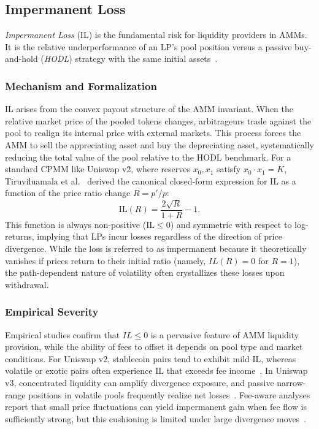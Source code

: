 \documentclass[10pt,conference,compsocconf]{IEEEtran}
\begin{document}
\subsection{Impermanent Loss}
\label{sec:background_il}

\emph{Impermanent Loss} (IL) is the fundamental risk for liquidity providers in AMMs. It is the relative underperformance of an LP's pool position versus a passive buy-and-hold (\emph{HODL}) strategy with the same initial assets~\cite{evans2021liquidity, aoyagi2020liquidity}.


\subsubsection{Mechanism and Formalization}
IL arises from the convex payout structure of the AMM invariant. When the relative market price of the pooled tokens changes, arbitrageurs trade against the pool to realign its internal price with external markets. This process forces the AMM to sell the appreciating asset and buy the depreciating asset, systematically reducing the total value of the pool relative to the HODL benchmark.
For a standard CPMM like Uniswap v2, where reserves $x_0, x_1$ satisfy $x_0 \cdot x_1 = K$, Tiruviluamala et al.~\cite{tiruviluamala2022general} derived the canonical closed-form expression for IL as a function of the price ratio change $R = p'/p$:
\begin{equation}
    \mathrm{IL}(R) = \frac{2\sqrt{R}}{1+R} - 1.
    \label{eq:il_canonical}
\end{equation}
This function is always non-positive ($\mathrm{IL} \le 0$) and symmetric with respect to log-returns, implying that LPs incur losses regardless of the direction of price divergence. While the loss is referred to as impermanent because it theoretically vanishes if prices return to their initial ratio (namely, $IL(R)=0$ for $R=1$), the path-dependent nature of volatility often crystallizes these losses upon withdrawal.

\subsubsection{Empirical Severity}
Empirical studies confirm that $IL \le 0$ is a pervasive feature of AMM liquidity provision, while the ability of fees to offset it depends on pool type and market conditions.
For Uniswap v2, stablecoin pairs tend to exhibit mild IL, whereas volatile or exotic pairs often experience IL that exceeds fee income~\cite{heimbach2021behavior, boueri2021g3m}.
In Uniswap v3, concentrated liquidity can amplify divergence exposure, and passive narrow-range positions in volatile pools frequently realize net losses~\cite{heimbach2022risks}.
Fee-aware analyses report that small price fluctuations can yield impermanent gain when fee flow is sufficiently strong, but this cushioning is limited under large divergence moves~\cite{roman2025impact}.
\end{document}
